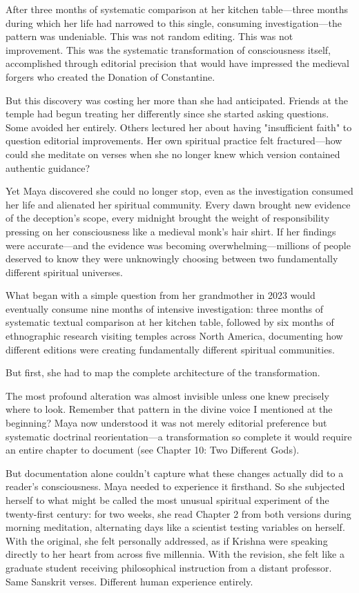 \documentclass[12pt,twoside]{book}
\begin{document}
After three months of systematic comparison at her kitchen table—three months during which her life had narrowed to this single, consuming investigation—the pattern was undeniable. This was not random editing. This was not improvement. This was the systematic transformation of consciousness itself, accomplished through editorial precision that would have impressed the medieval forgers who created the Donation of Constantine.

But this discovery was costing her more than she had anticipated. Friends at the temple had begun treating her differently since she started asking questions. Some avoided her entirely. Others lectured her about having "insufficient faith" to question editorial improvements. Her own spiritual practice felt fractured—how could she meditate on verses when she no longer knew which version contained authentic guidance?

Yet Maya discovered she could no longer stop, even as the investigation consumed her life and alienated her spiritual community. Every dawn brought new evidence of the deception's scope, every midnight brought the weight of responsibility pressing on her consciousness like a medieval monk's hair shirt. If her findings were accurate—and the evidence was becoming overwhelming—millions of people deserved to know they were unknowingly choosing between two fundamentally different spiritual universes.

What began with a simple question from her grandmother in 2023 would eventually consume nine months of intensive investigation: three months of systematic textual comparison at her kitchen table, followed by six months of ethnographic research visiting temples across North America, documenting how different editions were creating fundamentally different spiritual communities.

But first, she had to map the complete architecture of the transformation.

The most profound alteration was almost invisible unless one knew precisely where to look. Remember that pattern in the divine voice I mentioned at the beginning? Maya now understood it was not merely editorial preference but systematic doctrinal reorientation—a transformation so complete it would require an entire chapter to document (see Chapter 10: Two Different Gods).

But documentation alone couldn't capture what these changes actually did to a reader's consciousness. Maya needed to experience it firsthand. So she subjected herself to what might be called the most unusual spiritual experiment of the twenty-first century: for two weeks, she read Chapter 2 from both versions during morning meditation, alternating days like a scientist testing variables on herself. With the original, she felt personally addressed, as if Krishna were speaking directly to her heart from across five millennia. With the revision, she felt like a graduate student receiving philosophical instruction from a distant professor. Same Sanskrit verses. Different human experience entirely.
\end{document}
